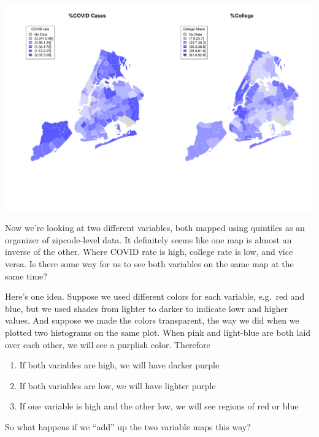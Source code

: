 \documentclass[
  openany]{book}
\providecommand{\tightlist}{%
  \setlength{\itemsep}{0pt}\setlength{\parskip}{0pt}}
\begin{document}
\begin{center}\includegraphics[width=0.9\linewidth]{carpedatum_files/figure-html/unnamed-chunk-95-1} \end{center}

Now we're looking at two different variables, both mapped using quintiles as an organizer of zipcode-level data. It definitely seems like one map is almost an inverse of the other. Where COVID rate is high, college rate is low, and vice versa. Is there some way for us to see both variables on the same map at the same time?

Here's one idea. Suppose we used different colors for each variable, e.g.~red and blue, but we used shades from lighter to darker to indicate lowr and higher values. And suppose we made the colors transparent, the way we did when we plotted two histograms on the same plot. When pink and light-blue are both laid over each other, we will see a purplish color. Therefore

\begin{enumerate}
\def\labelenumi{\arabic{enumi}.}
\tightlist
\item
  If both variables are high, we will have darker purple
\item
  If both variables are low, we will have lighter purple
\item
  If one variable is high and the other low, we will see regions of red or blue
\end{enumerate}

So what happens if we ``add'' up the two variable maps this way?
\end{document}
